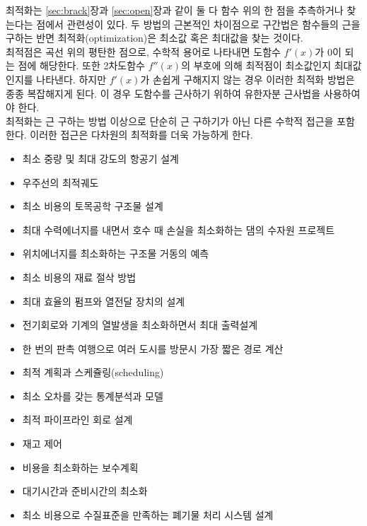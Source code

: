 최적화는 \ref{sec:brack}장과 \ref{sec:open}장과 같이 둘 다 함수 위의 한 점을 추측하거나 찾는다는 점에서 관련성이 있다. 두 방법의 근본적인 차이점으로 구간법은 함수들의 근을 구하는 반면 최적화(optimization)은 최소값 혹은 최대값을 찾는 것이다.\\ 최적점은 곡선 위의 평탄한 점으로, 수학적 용어로 나타내면 도함수 $f'(x)$가 $0$이 되는 점에 해당한다. 또한 2차도함수 $f''(x)$의 부호에 의해 최적점이 최소값인지 최대값인지를 나타낸다. 하지만 $f'(x)$가 손쉽게 구해지지 않는 경우 이러한 최적화 방법은 종종 복잡해지게 된다. 이 경우 도함수를 근사하기 위하여 유한자분 근사법을 사용하여야 한다.\\최적화는 근 구하는 방법 이상으로 단순히 근 구하기가 아닌 다른 수학적 접근을 포함한다. 이러한 접근은 다차원의 최적화를 더욱 가능하게 한다.
\begin{itemize}
\item 최소 중량 및 최대 강도의 항공기 설계
\item 우주선의 최적궤도
\item 최소 비용의 토목공학 구조물 설계
\item 최대 수력에너지를 내면서 호수 때 손실을 최소화하는 댐의 수자원 프로젝트
\item 위치에너지를 최소화하는 구조물 거동의 예측
\item 최소 비용의 재료 절삭 방법
\item 최대 효율의 펌프와 열전달 장치의 설계
\item 전기회로와 기계의 열발생을 최소화하면서 최대 출력설계
\item 한 번의 판촉 여행으로 여러 도시를 방문시 가장 짧은 경로 계산
\item 최적 계획과 스케쥴링(scheduling)
\item 최소 오차를 갖는 통계분석과 모델
\item 최적 파이프라인 회로 설계
\item 재고 제어
\item 비용을 최소화하는 보수계획
\item 대기시간과 준비시간의 최소화
\item 최소 비용으로 수질표준을 만족하는 폐기물 처리 시스템 설계
\end{itemize}

